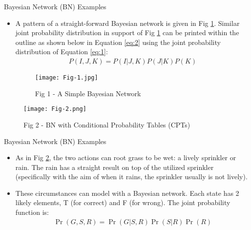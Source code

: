 \documentclass{beamer}
\providecommand{\pr}[1]{\ensuremath{\Pr\left(#1\right)}}
\begin{document}
\begin{frame}
 \begin{block}{Bayesian Network (BN) Examples}
    \begin{itemize}
    \item A pattern of a straight-forward Bayesian network is given in Fig \ref{Fig-1}. Similar joint probability distribution in support of Fig \ref{Fig-1} can be printed within the outline as shown below in Equation \eqref{eq:2} using the joint probability distribution of Equation \eqref{eq:1}:
    \begin{align}
     P(I,J,K) = P(I|J,K) P(J|K) P(K) \label{eq:2}
    \end{align}
    \begin{figure}[ht]
        \centering
        \texttt{[image: Fig-1.jpg]}
        \caption{Fig 1 - A Simple Bayesian Network}
        \label{Fig-1}
    \end{figure}
    \end{itemize}
 \end{block}   
\end{frame}



\begin{frame}
        \begin{figure}[ht]
            \centering
            \texttt{[image: Fig-2.png]}
            \caption{Fig 2 - BN with Conditional Probability Tables (CPTs)}
            \label{Fig-2}
        \end{figure}
\end{frame}

\begin{frame}
 \begin{block}{Bayesian Network (BN) Examples}
    \begin{itemize}
    \item As in Fig \ref{Fig-2}, the two actions can root grass to be wet: a  lively sprinkler or rain. The rain has a straight result on top of the utilized sprinkler (specifically with the aim of when it rains, the sprinkler usually is not lively).
    \item These circumstances can model with a Bayesian network. Each state has 2 likely elements, T (for correct) and F (for wrong). The joint probability function is: 
    \begin{align}
     \pr{G,S,R} = \pr{G|S,R} \pr{S|R} \pr{R} \label{eq:3}
    \end{align}
    \end{itemize}
 \end{block}   
\end{frame}
\end{document}
